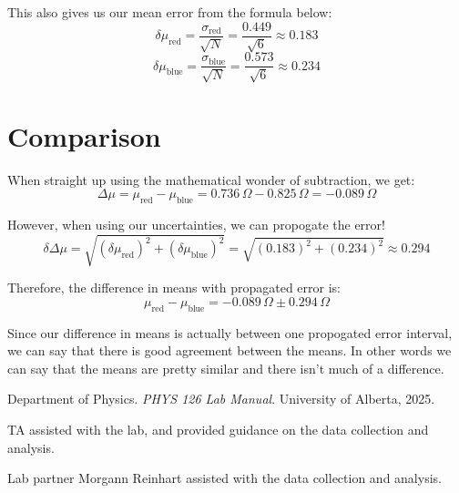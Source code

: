 \documentclass[12pt]{article}
\begin{document}
This also gives us our mean error from the formula below:
\[
\delta \mu_{\text{red}} = \frac{\sigma_{\text{red}}}{\sqrt{N}} = \frac{0.449}{\sqrt{6}} \approx 0.183
\]
\[
\delta \mu_{\text{blue}} = \frac{\sigma_{\text{blue}}}{\sqrt{N}} = \frac{0.573}{\sqrt{6}} \approx 0.234
\]
\section{Comparison}

When straight up using the mathematical wonder of subtraction, we get: 
\[
\Delta \mu = \mu_{\text{red}} - \mu_{\text{blue}} = 0.736 \, \Omega - 0.825 \, \Omega = -0.089 \, \Omega
\]

However, when using our uncertainties, we can propogate the error!
\[
\delta \Delta \mu = \sqrt{(\delta \mu_{\text{red}})^2 + (\delta \mu_{\text{blue}})^2} = \sqrt{(0.183)^2 + (0.234)^2} \approx 0.294
\]

Therefore, the difference in means with propagated error is:
\[
\mu_{\text{red}} - \mu_{\text{blue}} = -0.089 \, \Omega \pm 0.294 \, \Omega
\]

Since our difference in means is actually between one propogated error interval, we can say that there is good agreement between the means. In other words
we can say that the means are pretty similar and there isn't much of a difference.

\renewcommand{\bibname}{5\ \ \References and Acknowledgements}
\begin{thebibliography}{9}
    Department of Physics. \textit{PHYS 126 Lab Manual}. University of Alberta, 2025.

    TA assisted with the lab, and provided guidance on the data collection and analysis.

    Lab partner Morgann Reinhart assisted with the data collection and analysis.
    
\end{thebibliography}
\end{document}
